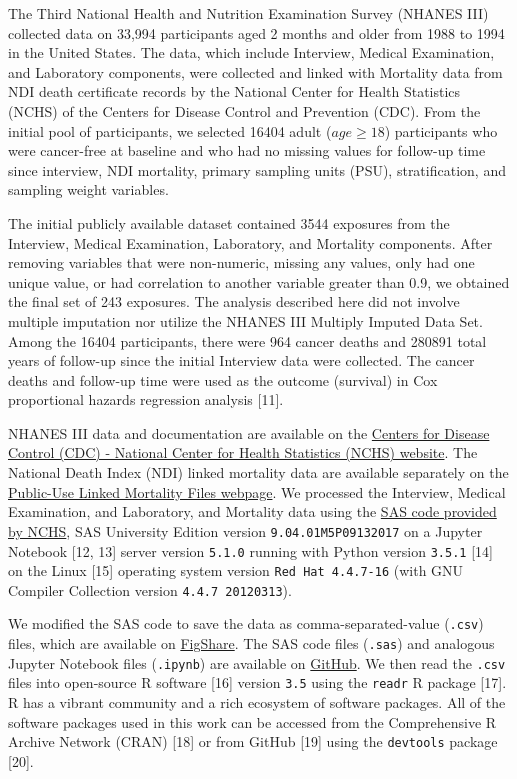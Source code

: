 \documentclass[12pt,oneside]{reedthesis}
\theoremstyle{definition}
\theoremstyle{definition}
\theoremstyle{definition}
\theoremstyle{remark}
\begin{document}
The Third National Health and Nutrition Examination Survey (NHANES III)
collected data on 33,994 participants aged 2 months and older from 1988
to 1994 in the United States. The data, which include Interview, Medical
Examination, and Laboratory components, were collected and linked with
Mortality data from NDI death certificate records by the National Center
for Health Statistics (NCHS) of the Centers for Disease Control and
Prevention (CDC). From the initial pool of participants, we selected
16404 adult (\(age \geq 18\)) participants who were cancer-free at
baseline and who had no missing values for follow-up time since
interview, NDI mortality, primary sampling units (PSU), stratification,
and sampling weight variables.

The initial publicly available dataset contained 3544 exposures from the
Interview, Medical Examination, Laboratory, and Mortality components.
After removing variables that were non-numeric, missing any values, only
had one unique value, or had correlation to another variable greater
than 0.9, we obtained the final set of 243 exposures. The analysis
described here did not involve multiple imputation nor utilize the
NHANES III Multiply Imputed Data Set. Among the 16404 participants,
there were 964 cancer deaths and 280891 total years of follow-up since
the initial Interview data were collected. The cancer deaths and
follow-up time were used as the outcome (survival) in Cox proportional
hazards regression analysis {[}11{]}.

NHANES III data and documentation are available on the
\href{https://wwwn.cdc.gov/nchs/nhanes/nhanes3/DataFiles.aspx}{Centers
for Disease Control (CDC) - National Center for Health Statistics (NCHS)
website}. The National Death Index (NDI) linked mortality data are
available separately on the
\href{https://www.cdc.gov/nchs/data-linkage/mortality-public.htm}{Public-Use
Linked Mortality Files webpage}. We processed the Interview, Medical
Examination, and Laboratory, and Mortality data using the
\href{https://wwwn.cdc.gov/nchs/nhanes/nhanes3/DataFiles.aspx}{SAS code
provided by NCHS}, SAS University Edition version
\texttt{9.04.01M5P09132017} on a Jupyter Notebook {[}12, 13{]} server
version \texttt{5.1.0} running with Python version \texttt{3.5.1}
{[}14{]} on the Linux {[}15{]} operating system version
\texttt{Red\ Hat\ 4.4.7-16} (with GNU Compiler Collection version
\texttt{4.4.7\ 20120313}).

We modified the SAS code to save the data as comma-separated-value
(\texttt{.csv}) files, which are available on
\href{https://figshare.com/articles/adult_csv/6210263}{FigShare}. The
SAS code files (\texttt{.sas}) and analogous Jupyter Notebook files
(\texttt{.ipynb}) are available on
\href{https://github.com/marskar/nhanes}{GitHub}. We then read the
\texttt{.csv} files into open-source R software {[}16{]} version
\texttt{3.5} using the \texttt{readr} R package {[}17{]}. R has a
vibrant community and a rich ecosystem of software packages. All of the
software packages used in this work can be accessed from the
Comprehensive R Archive Network (CRAN) {[}18{]} or from GitHub {[}19{]}
using the \texttt{devtools} package {[}20{]}.
\end{document}
